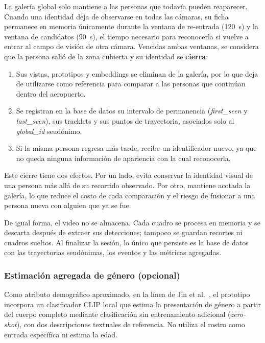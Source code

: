 \documentclass[12pt,letterpaper]{article}
\begin{document}
La galería global solo mantiene a las personas que todavía pueden
reaparecer. Cuando una identidad deja de observarse en todas las
cámaras, su ficha permanece en memoria únicamente durante la ventana de
re-entrada (120~s) y la ventana de candidatos (90~s), el tiempo
necesario para reconocerla si vuelve a entrar al campo de visión de
otra cámara. Vencidas ambas ventanas, se considera que la persona salió
de la zona cubierta y su identidad se \textbf{cierra}:

\begin{enumerate}
    \item Sus vistas, prototipos y embeddings se eliminan de la galería,
    por lo que deja de utilizarse como referencia para comparar a las
    personas que continúan dentro del aeropuerto.
    \item Se registran en la base de datos su intervalo de permanencia
    (\textit{first\_seen} y \textit{last\_seen}), sus tracklets y sus
    puntos de trayectoria, asociados solo al \textit{global\_id}
    seudónimo.
    \item Si la misma persona regresa más tarde, recibe un identificador
    nuevo, ya que no queda ninguna información de apariencia con la cual
    reconocerla.
\end{enumerate}

Este cierre tiene dos efectos. Por un lado, evita conservar la identidad
visual de una persona más allá de su recorrido observado. Por otro,
mantiene acotada la galería, lo que reduce el costo de cada comparación
y el riesgo de fusionar a una persona nueva con alguien que ya se fue.

De igual forma, el video no se almacena. Cada cuadro se procesa en
memoria y se descarta después de extraer sus detecciones; tampoco se
guardan recortes ni cuadros sueltos. Al finalizar la sesión, lo único
que persiste es la base de datos con las trayectorias seudónimas, los
eventos y las métricas agregadas.

\subsubsection{Estimación agregada de género (opcional)}

Como atributo demográfico aproximado, en la línea de Jin et
al.~\cite{jin2024}, el prototipo incorpora un clasificador CLIP local que
estima la presentación de género a partir del cuerpo completo mediante
clasificación sin entrenamiento adicional (\textit{zero-shot}), con dos
descripciones textuales de referencia. No utiliza el rostro como entrada
específica ni estima la edad.
\end{document}
